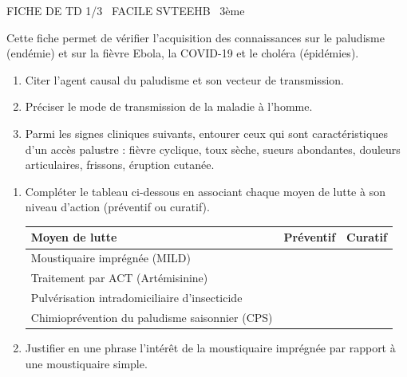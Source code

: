 \documentclass[11pt]{article}
\begin{document}
\begin{tcolorbox}[enhanced,colback=popink,colframe=popink,arc=10pt,boxrule=0pt,left=12pt,right=12pt,top=9pt,bottom=9pt]
{\color{white}\popxbold\small FICHE DE TD 1/3 \textbullet\ FACILE \hfill SVTEEHB \textbullet\ 3ème\par}
\end{tcolorbox}
\vspace{4pt}
Cette fiche permet de vérifier l'acquisition des connaissances sur le paludisme (endémie) et sur la fièvre Ebola, la COVID-19 et le choléra (épidémies).

\begin{exercice}
\begin{enumerate}
    \item Citer l'agent causal du paludisme et son vecteur de transmission.
    \item Préciser le mode de transmission de la maladie à l'homme.
    \item Parmi les signes cliniques suivants, entourer ceux qui sont caractéristiques d'un accès palustre : fièvre cyclique, toux sèche, sueurs abondantes, douleurs articulaires, frissons, éruption cutanée.
\end{enumerate}
\end{exercice}

\begin{exercice}
\begin{enumerate}
    \item Compléter le tableau ci-dessous en associant chaque moyen de lutte à son niveau d'action (préventif ou curatif).
    \begin{tabular}{|l|c|c|}
    \hline
    \textbf{Moyen de lutte} & \textbf{Préventif} & \textbf{Curatif} \\
    \hline
    Moustiquaire imprégnée (MILD) & & \\
    \hline
    Traitement par ACT (Artémisinine) & & \\
    \hline
    Pulvérisation intradomiciliaire d'insecticide & & \\
    \hline
    Chimioprévention du paludisme saisonnier (CPS) & & \\
    \hline
    \end{tabular}
    \item Justifier en une phrase l'intérêt de la moustiquaire imprégnée par rapport à une moustiquaire simple.
\end{enumerate}
\end{exercice}
\end{document}
